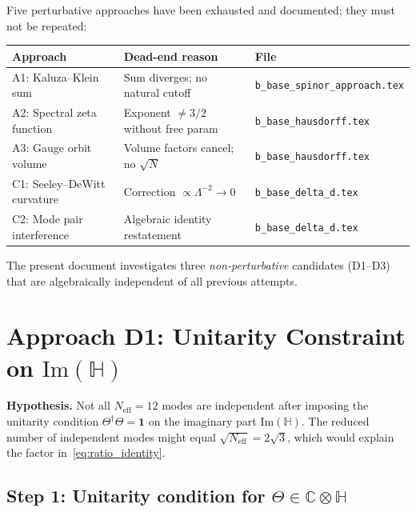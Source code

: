 \documentclass[11pt,a4paper]{article}
\theoremstyle{definition}
\theoremstyle{remark}
\begin{document}
Five perturbative approaches have been exhausted and documented; they must not be
repeated:

\begin{center}
\begin{tabular}{lll}
  \hline
  Approach & Dead-end reason & File \\
  \hline
  A1: Kaluza--Klein sum & Sum diverges; no natural cutoff & \texttt{b\_base\_spinor\_approach.tex} \\
  A2: Spectral zeta function & Exponent $\ne 3/2$ without free param & \texttt{b\_base\_hausdorff.tex} \\
  A3: Gauge orbit volume & Volume factors cancel; no $\sqrt{N}$ & \texttt{b\_base\_hausdorff.tex} \\
  C1: Seeley--DeWitt curvature & Correction $\propto \Lambda^{-2} \to 0$ & \texttt{b\_base\_delta\_d.tex} \\
  C2: Mode pair interference & Algebraic identity restatement & \texttt{b\_base\_delta\_d.tex} \\
  \hline
\end{tabular}
\end{center}

The present document investigates three \emph{non-perturbative} candidates
(D1--D3) that are algebraically independent of all previous attempts.

\section{Approach D1: Unitarity Constraint on $\mathrm{Im}(\mathbb{H})$}
\label{sec:D1_unitarity}

\textbf{Hypothesis.}
Not all $N_{\mathrm{eff}} = 12$ modes are independent after imposing the
unitarity condition $\Theta^\dagger\Theta = \mathbf{1}$ on the imaginary part
$\mathrm{Im}(\mathbb{H})$.
The reduced number of independent modes might equal $\sqrt{N_{\mathrm{eff}}} = 2\sqrt{3}$,
which would explain the factor in~\eqref{eq:ratio_identity}.

\subsection{Step 1: Unitarity condition for $\Theta \in \mathbb{C}\otimes\mathbb{H}$}
\end{document}
